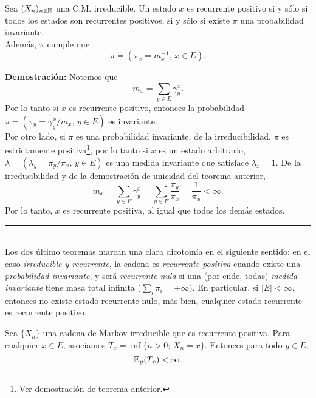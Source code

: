 \begin{teorema}
Sea $(X_n)_{n\in \mathbb N}$ una C.M. irreducible. Un estado $x$ es recurrente positivo si y sólo si todos los estados son recurrentes positivos, si y sólo si existe $\pi$ una probabilidad invariante.\\ \newline
Además, $\pi$ cumple que
\[\pi = (\pi_x = m_x^{-1},\,x\in E).\]
\end{teorema}

\textbf{Demostración: }Notemos que
\[m_x = \sum_{y\in E}\gamma_y^x.\]
Por lo tanto si $x$ es recurrente positivo, entonces la probabilidad $\pi = (\pi_y = \gamma_y^x/m_x,\,y\in E)$ es invariante.\\ 

Por otro lado, si $\pi$ es una probabilidad invariante, de la irreducibilidad, $\pi$ es estrictamente positiva\footnote{Ver demostración de teorema anterior.}, por lo tanto si $x$ es un estado arbitrario, $\lambda = (\lambda_y = \pi_y / \pi_x,\, y \in E)$ es una medida invariante que satisface $\lambda_x =1$. De la irreducibilidad y de la demostración de unicidad del teorema anterior,
\[m_x = \sum_{y\in E}\gamma_y^x = \sum_{y\in E}\frac{\pi_y}{\pi_x} = \frac{1}{\pi_x} <\infty.\]
Por lo tanto, $x$ es recurrente positiva, al igual que todos los demás estados.\\
\rule{0.7em}{0.7em}\\ \newline
Los dos último teoremas marcan una clara dicotomía en el siguiente sentido: en el caso \textit{irreducible y recurrente}, la cadena es \textit{recurrente positiva} cuando existe una \textit{probabilidad invariante}, y será \textit{recurrente nula} si una (por ende, todas) \textit{medida invariante} tiene masa total infinita ($\sum_i \pi_i = +\infty$). En particular, si $|E|<\infty$, entonces no existe estado recurrente nulo, más bien, cualquier estado recurrente es recurrente positivo.

\begin{cor}
Sea $\{X_n\}$ una cadena de Markov irreducible que es recurrente positiva. Para cualquier $x \in E$, asociamos $T_x =\inf\{n>0;\,X_n=x\}$. Entonces para todo $y\in E$,
\[\mathbb E_y(T_x) < \infty.\]
\end{cor}


